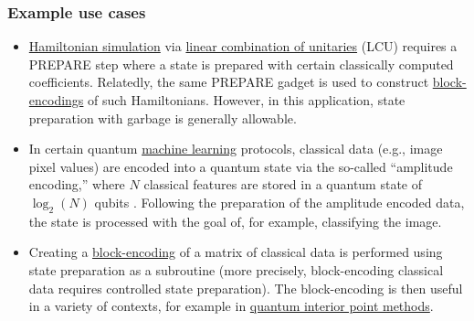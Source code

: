 \begin{refsection}

\subsubsection*{Example use cases}

\begin{itemize}
    \item \hyperref[prim:TaylorDyson]{Hamiltonian simulation} via \hyperref[prim:LCU]{linear combination of unitaries} (LCU) requires a PREPARE step where a state is prepared with certain classically computed coefficients. Relatedly, the same PREPARE gadget is used to construct \hyperref[prim:BlockEncodings]{block-encodings} of such Hamiltonians. However, in this application, state preparation with garbage is generally allowable.
    \item In certain quantum \hyperref[appl:ClassicalML]{machine learning} protocols, classical data (e.g., image pixel values) are encoded into a quantum state via the so-called ``amplitude encoding,'' where $N$ classical features are stored in a quantum state of $\log_2(N)$ qubits \cite{schuld2021machineLearning}. Following the preparation of the amplitude encoded data, the state is processed with the goal of, for example, classifying the image. 
    \item Creating a \hyperref[prim:BlockEncodingsClassical]{block-encoding} of a matrix of classical data is performed using state preparation as a subroutine (more precisely, block-encoding classical data requires controlled state preparation). The block-encoding is then useful in a variety of contexts, for example in \hyperref[prim:QIPM]{quantum interior point methods}.
\end{itemize}



\end{refsection}

